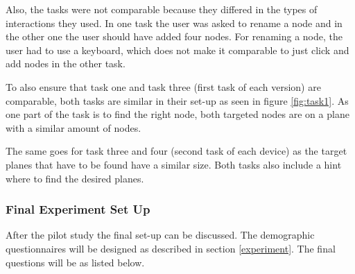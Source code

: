 Also, the tasks were not comparable because they differed in the types of interactions they used.
In one task the user was asked to rename a node and in the other one the user should have added four nodes.
For renaming a node, the user had to use a keyboard, which does not make it comparable to just click and add nodes in the other task.

To also ensure that task one and task three (first task of each version) are comparable, both tasks are similar in their set-up as seen in figure \ref{fig:task1}.
As one part of the task is to find the right node, both targeted \glspl{node} are on a \gls{plane} with a similar amount of nodes.

The same goes for task three and four (second task of each device) as the target \glspl{plane} that have to be found have a similar size. 
Both tasks also include a hint where to find the desired \glspl{plane}.

\subsubsection{Final Experiment Set Up}
\label{final}
After the pilot study the final set-up can be discussed.
The demographic questionnaires will be designed as described in section \ref{experiment}.
The final questions will be as listed below.
